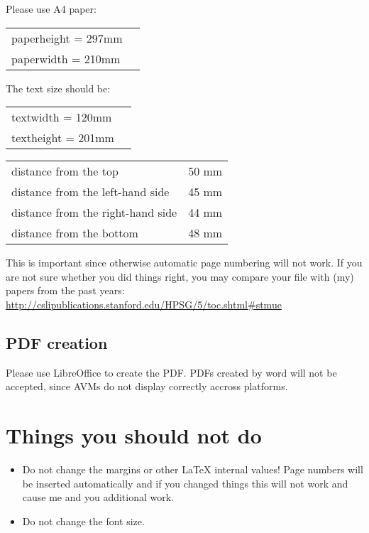 \documentclass[11pt,a4paper,fleqn]{article}
\begin{document}
Please use A4 paper:
\begin{table}[H]
\begin{tabular}{@{}ll}
paperheight  = 297mm\\
paperwidth   = 210mm
\end{tabular}
\end{table}
%
The text size should be:
\begin{table}[H]
\begin{tabular}{@{}ll}
textwidth  = 120mm\\
textheight = 201mm
\end{tabular}
\end{table}

\begin{table}[H]
\begin{tabular}{@{}l@{ = }l}
distance from the top & 50 mm\\
distance from the left-hand side & 45 mm\\
distance from the right-hand side & 44 mm\\
distance from the bottom & 48 mm\\
\end{tabular}
\end{table}

This is important since otherwise automatic page numbering will not work.
If you are not sure whether you did things right, you may compare your file
with (my) papers from the past years:\newline 
\url{http://cslipublications.stanford.edu/HPSG/5/toc.shtml#stmue}

\subsection{PDF creation}
\label{sec-pdf-creation-word}

Please use LibreOffice to create the PDF. PDFs created by word will not be accepted, since AVMs do
not display correctly accross platforms.

\section{Things you should not do}

\begin{itemize}
\item Do not change the margins or other \LaTeX{} internal values! Page numbers will be inserted automatically and
      if you changed things this will not work and cause me and you additional work.
\item Do not change the font size.
\end{itemize}
\end{document}
